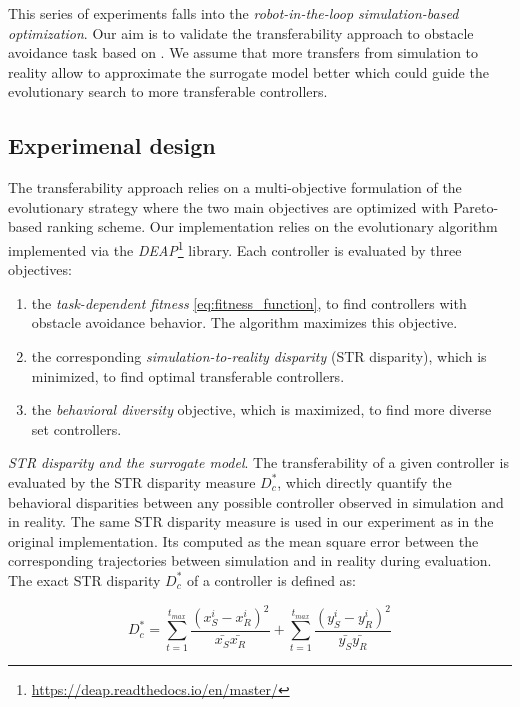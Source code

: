 This series of experiments falls into the \emph{robot-in-the-loop simulation-based optimization}. Our aim is to validate the transferability approach to obstacle avoidance task based on \citep{koos2012transferability}. We assume that more transfers from simulation to reality allow to approximate the surrogate model better which could guide the evolutionary search to more transferable controllers.

\subsection{Experimenal design}

The transferability approach relies on a multi-objective formulation of the evolutionary strategy where the two main objectives are optimized with Pareto-based ranking scheme. Our implementation relies on the \citep{deb2000fast} evolutionary algorithm implemented via the \emph{DEAP}\footnote{\url{https://deap.readthedocs.io/en/master/}} library. Each controller is evaluated by three objectives:

\begin{enumerate}
	\item the \emph{task-dependent fitness} \ref{eq:fitness_function}, to find controllers with obstacle avoidance behavior. 	The algorithm maximizes this objective.
	\item the corresponding \emph{simulation-to-reality disparity} (STR disparity), which is minimized, to find optimal transferable controllers.
	\item the \emph{behavioral diversity} objective, which is maximized, to find more diverse set controllers.
\end{enumerate}

\emph{STR disparity and the surrogate model}. The transferability of a given controller is evaluated by the  STR disparity measure \(D^{*}_{{c}}\), which directly quantify the behavioral disparities between any possible controller observed in simulation and in reality. The same STR disparity measure is used in our experiment as in the original implementation. Its computed as the mean square error between the corresponding trajectories between simulation and in reality during evaluation. The exact STR disparity \(D^{*}_{{c}}\) of a controller is defined as:

\begin{equation}
	D^{*}_{{c}} = \sum_{t=1}^{t_{max}} \frac{(x^{i}_{S} - x^{i}_{R})^{2}}{\bar{x_{S}}\bar{x_{R}}} + 							  \sum_{t=1}^{t_{max}} \frac{(y^{i}_{S} - y^{i}_{R})^{2}}{\bar{y_{S}}\bar{y_{R}}}
	\label{eq:The exact STR disparity measure.}
\end{equation}

